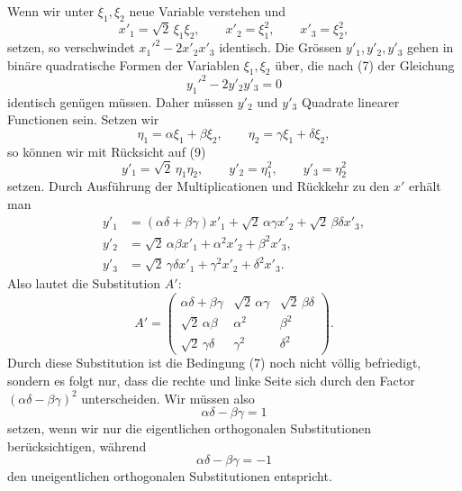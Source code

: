 \documentclass[11pt]{article}
\begin{document}
Wenn wir unter $\xi_1,\xi_2$ neue Variable verstehen und
\begin{equation}
x'_1=\sqrt2\,\xi_1\xi_2,\qquad x'_2=\xi_1^2,
\qquad x'_3=\xi_2^2,
\tag{8}
\end{equation}
setzen, so verschwindet $x_1'^2-2x'_2x'_3$ identisch. Die Grössen $y'_1,y'_2,y'_3$ gehen in binäre quadratische Formen der Variablen $\xi_1,\xi_2$ über, die nach (7) der Gleichung
\begin{equation}
y_1'^2-2y'_2y'_3=0
\tag{9}
\end{equation}
identisch genügen müssen. Daher müssen $y'_2$ und $y'_3$ Quadrate linearer Functionen sein. Setzen wir
\begin{equation}
\eta_1=\alpha\xi_1+\beta\xi_2,
\qquad
\eta_2=\gamma\xi_1+\delta\xi_2,
\tag{10}
\end{equation}
so können wir mit Rücksicht auf (9)
\begin{equation}
y'_1=\sqrt2\,\eta_1\eta_2,
\qquad y'_2=\eta_1^2,
\qquad y'_3=\eta_2^2
\tag{11}
\end{equation}
setzen. Durch Ausführung der Multiplicationen und Rückkehr zu den $x'$ erhält man
\begin{align*}
y'_1&=(\alpha\delta+\beta\gamma)x'_1+\sqrt2\,\alpha\gamma x'_2+\sqrt2\,\beta\delta x'_3,\\
y'_2&=\sqrt2\,\alpha\beta x'_1+\alpha^2x'_2+\beta^2x'_3,\\
y'_3&=\sqrt2\,\gamma\delta x'_1+\gamma^2x'_2+\delta^2x'_3.
\end{align*}
Also lautet die Substitution $A'$:
\begin{equation}
A'=\begin{pmatrix}
\alpha\delta+\beta\gamma&\sqrt2\,\alpha\gamma&\sqrt2\,\beta\delta\\
\sqrt2\,\alpha\beta&\alpha^2&\beta^2\\
\sqrt2\,\gamma\delta&\gamma^2&\delta^2
\end{pmatrix}.
\tag{12}
\end{equation}
Durch diese Substitution ist die Bedingung (7) noch nicht völlig befriedigt, sondern es folgt nur, dass die rechte und linke Seite sich durch den Factor $(\alpha\delta-\beta\gamma)^2$ unterscheiden. Wir müssen also
\begin{equation}
\alpha\delta-\beta\gamma=1
\tag{13}
\end{equation}
setzen, wenn wir nur die eigentlichen orthogonalen Substitutionen berücksichtigen, während
\begin{equation}
\alpha\delta-\beta\gamma=-1
\tag{14}
\end{equation}
den uneigentlichen orthogonalen Substitutionen entspricht.
\end{document}
